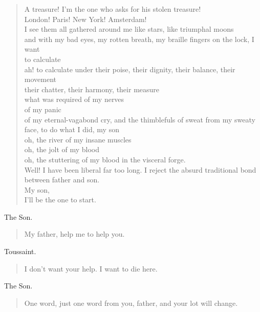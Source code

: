 \documentclass[letterpaper,article,12pt,oneside,notitlepage]{memoir}
\begin{document}
\begin{verse}
A treasure! I'm the one who asks for his stolen treasure! \\
London! Paris! New York! Amsterdam! \\
I see them all gathered around me like stars, like triumphal moons \\
and with my bad eyes, my rotten breath, my braille fingers on the lock, I want \\
to calculate \\
ah! to calculate under their poise, their dignity, their balance, their movement \\
their chatter, their harmony, their measure \\
what was required of my nerves \\
of my panic \\
of my eternal-vagabond cry, and the thimblefuls of sweat from my sweaty face, to do what I did, my son  \\
oh, the river of my insane muscles \\
oh, the jolt of my blood \\
oh, the stuttering of my blood in the visceral forge.   \\
Well! I have been liberal far too long. I reject the absurd traditional bond between father and son. \\
My son, \\
I'll be the one to start. \\
\end{verse}

\begin{center}The Son.\end{center}

\begin{verse}
My father, help me to help you. \\
\end{verse}

\begin{center}Toussaint.\end{center}

\begin{verse}
I don't want your help. I want to die here. \\
\end{verse}

\begin{center}The Son.\end{center}

\begin{verse}
One word, just one word from you, father, and your lot will change. \\
\end{verse}
\end{document}
